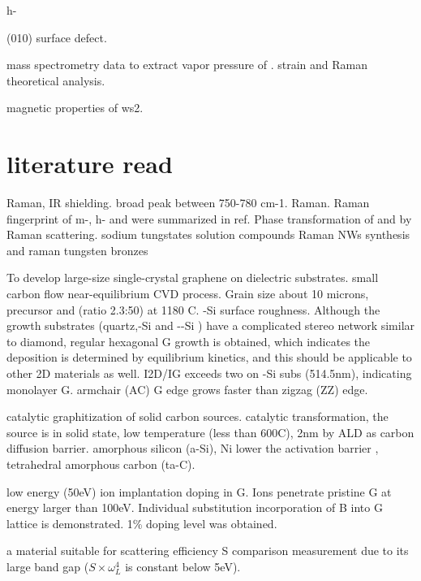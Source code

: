 h- \cite{Lunk2010} \cite{Zheng2009}

 (010) surface defect. \cite{Chen2001}

mass spectrometry data to extract vapor pressure of .
strain and Raman theoretical analysis.\cite{Chang2013a} 

magnetic properties of ws2.\cite{Zhang2013j} 


\section{literature read}

 Raman, IR shielding.\cite{Guo2012} \cite{Guo2011}
broad peak between 750-780 cm-1.
 Raman. \cite{Knee1979}
Raman fingerprint of m-, h- and  were summarized in ref\cite{Daniel1987}.
Phase transformation of  and  by Raman scattering. \cite{Lima2011}
sodium tungstates solution compounds Raman \cite{Redkin2010}
 NWs synthesis and raman \cite{Ma2005}
tungsten bronzes \cite{Wiseman1976}



To develop large-size single-crystal graphene on dielectric substrates. small carbon flow near-equilibrium CVD process. Grain size about 10 microns, precursor  and  (ratio 2.3:50) at 1180 C. -Si surface roughness. Although the growth substrates (quartz,-Si and --Si ) have a complicated stereo network similar to diamond, regular hexagonal G growth is obtained, which indicates the deposition is determined by equilibrium kinetics, and this should be applicable to other 2D materials as well. I2D/IG exceeds two on -Si subs (514.5nm), indicating monolayer G. armchair (AC) G edge grows faster than zigzag (ZZ) edge.\cite{Chen2013j}

catalytic graphitization of solid carbon sources. catalytic transformation, the source is in solid state, low temperature (less than 600C), 2nm   by ALD as carbon diffusion barrier. amorphous silicon (a-Si), Ni lower the activation barrier ,  tetrahedral amorphous carbon (ta-C).\cite{Weatherup2013}

low energy (50eV) ion implantation doping in G. Ions penetrate pristine G at energy larger than 100eV. Individual substitution incorporation of B into G lattice is demonstrated. 1\% doping level was obtained. \cite{Bangert2013}

 a material suitable for scattering efficiency S comparison measurement due to its large band gap ($S\times \omega_L^4$ is constant below 5eV).

